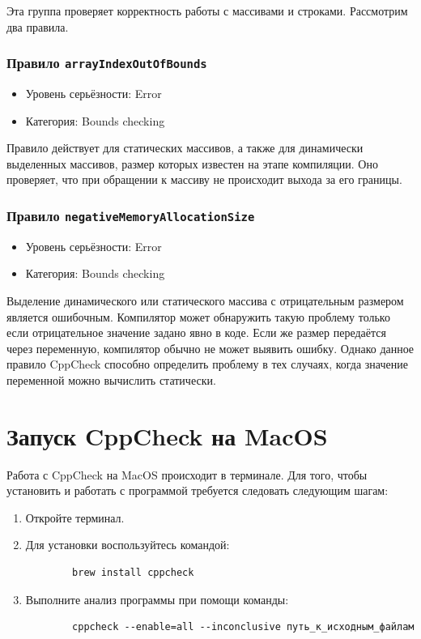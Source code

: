 \documentclass{article}[14pt]
\begin{document}
Эта группа проверяет корректность работы с массивами и строками. Рассмотрим два правила.

\subsubsection*{Правило \texttt{arrayIndexOutOfBounds}}
\begin{itemize}
\item Уровень серьёзности: Error
\item Категория: Bounds checking
\end{itemize}
Правило действует для статических массивов, а также для динамически выделенных массивов, размер которых известен на этапе компиляции. 
Оно проверяет, что при обращении к массиву не происходит выхода за его границы.

\subsubsection*{Правило \texttt{negativeMemoryAllocationSize}}
\begin{itemize}
\item Уровень серьёзности: Error
\item Категория: Bounds checking
\end{itemize}
Выделение динамического или статического массива с отрицательным размером является ошибочным. Компилятор может обнаружить такую проблему 
только если отрицательное значение задано явно в коде. Если же размер передаётся через переменную, компилятор обычно не может выявить ошибку. 
Однако данное правило CppCheck способно определить проблему в тех случаях, когда значение переменной можно вычислить статически.

\pagebreak

\section{Запуск CppCheck на MacOS}

Работа с CppCheck на MacOS происходит в терминале. Для того, чтобы установить и работать с программой требуется следовать следующим шагам:

\begin{enumerate}
	\item Откройте терминал.
	\item Для установки воспользуйтесь командой:
	
	\begin{verbatim}
		brew install cppcheck
	\end{verbatim}

	\item Выполните анализ программы при помощи команды:
	
	\begin{verbatim}
		cppcheck --enable=all --inconclusive путь_к_исходным_файлам
	\end{verbatim}

\end{enumerate}
\end{document}
